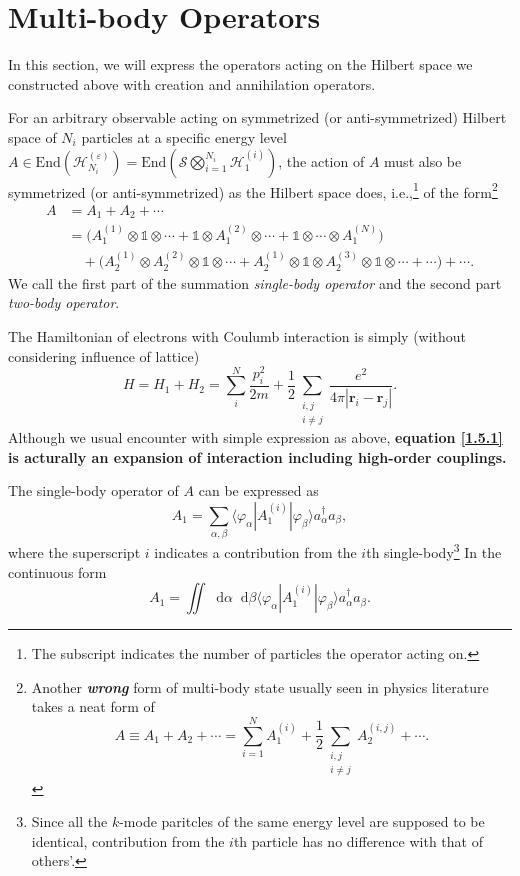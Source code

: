 \documentclass[b5paper,10pt,UTF8]{book}
\newcommand*\dd{\mathop{}\!\mathrm{d}}
\numberwithin{equation}{section}
\begin{document}
	\section{Multi-body Operators}
		In this section, we will express the operators acting on the Hilbert space we constructed above with creation and annihilation operators. 
		\begin{Def}
			For an arbitrary observable acting on symmetrized (or anti-symmetrized) Hilbert space of $N_i$ particles at a specific energy level $A\in\mathrm{End}(\mathcal{H}_{N_i}^{(\varepsilon)})=\displaystyle\mathrm{End}\left(\mathcal{S}\bigotimes_{i=1}^{N_i}\mathcal{H}^{(i)}_1\right)$, the action of $A$ must also be symmetrized (or anti-symmetrized) as the Hilbert space does, i.e.,\footnote{The subscript indicates the number of particles the operator acting on.} of the form\footnote{Another \textbf{\emph{wrong}} form of multi-body state usually seen in physics literature takes a neat form of $$A\equiv A_1+A_2+\cdots=\sum_{i=1}^N A^{(i)}_1+\dfrac{1}{2}\sum_{\substack{i,j\\i\neq j}}A_2^{(i,j)}+\cdots.$$}
			\begin{align}
				A&=A_1+A_2+\cdots\nonumber\\
				&=\bigg(A_1^{(1)}\otimes\mathbb{1}\otimes\cdots+\mathbb{1}\otimes A_1^{(2)}\otimes\cdots+\mathbb{1}\otimes\cdots\otimes A_1^{(N)}\bigg)\nonumber\\
				&\quad+\bigg(A_2^{(1)}\otimes A_2^{(2)}\otimes\mathbb{1}\otimes\cdots+A_2^{(1)}\otimes\mathbb{1}\otimes A_2^{(3)}\otimes\mathbb{1}\otimes\cdots+\cdots\bigg)+\cdots.\label{1.5.1}
			\end{align}
			We call the first part of the summation \emph{single-body operator} and the second part \emph{two-body operator}.
		\end{Def}
		\begin{Example}
			The Hamiltonian of electrons with Coulumb interaction is simply (without considering influence of lattice)
			$$ H=H_1+H_2=\sum_i^N\dfrac{p_i^2}{2m}+\dfrac{1}{2}\sum_{\substack{i,j\\i\neq j}}\frac{e^2}{4\pi|\bm{r}_i-\bm{r}_j|}.$$
			Although we usual encounter with simple expression as above, \textbf{equation \eqref{1.5.1} is acturally an expansion of interaction including high-order couplings.}
		\end{Example}
		\begin{Proposition}
			The single-body operator of $A$ can be expressed as
			\begin{equation}\label{1.5.2}
				A_1=\sum_{\alpha,\beta}\langle\varphi_\alpha|A_1^{(i)}|\varphi_\beta\rangle a_\alpha^\dagger a_\beta,
			\end{equation}
			where the superscript $i$ indicates a contribution from the $i$th single-body\footnote{Since all the $k$-mode paritcles of the same energy level are supposed to be identical, contribution from the $i$th particle has no difference with that of others'.}
			In the continuous form
			$$A_1=\iint\dd\alpha\dd\beta\langle\varphi_\alpha|A_1^{(i)}|\varphi_\beta\rangle a_\alpha^\dagger a_\beta.$$
		\end{Proposition}
\end{document}
